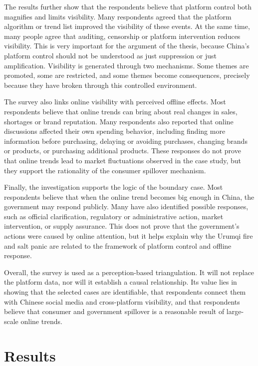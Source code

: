 \documentclass[conference]{IEEEtran}
\begin{document}
The results further show that the respondents believe that platform control both magnifies and limits visibility. Many respondents agreed that the platform algorithm or trend list improved the visibility of these events. At the same time, many people agree that auditing, censorship or platform intervention reduces visibility. This is very important for the argument of the thesis, because China's platform control should not be understood as just suppression or just amplification. Visibility is generated through two mechanisms. Some themes are promoted, some are restricted, and some themes become consequences, precisely because they have broken through this controlled environment.

The survey also links online visibility with perceived offline effects. Most respondents believe that online trends can bring about real changes in sales, shortages or brand reputation. Many respondents also reported that online discussions affected their own spending behavior, including finding more information before purchasing, delaying or avoiding purchases, changing brands or products, or purchasing additional products. These responses do not prove that online trends lead to market fluctuations observed in the case study, but they support the rationality of the consumer spillover mechanism.

Finally, the investigation supports the logic of the boundary case. Most respondents believe that when the online trend becomes big enough in China, the government may respond publicly. Many have also identified possible responses, such as official clarification, regulatory or administrative action, market intervention, or supply assurance. This does not prove that the government's actions were caused by online attention, but it helps explain why the Urumqi fire and salt panic are related to the framework of platform control and offline response.

Overall, the survey is used as a perception-based triangulation. It will not replace the platform data, nor will it establish a causal relationship. Its value lies in showing that the selected cases are identifiable, that respondents connect them with Chinese social media and cross-platform visibility, and that respondents believe that consumer and government spillover is a reasonable result of large-scale online trends.

\FloatBarrier

\section{Results}
\end{document}
